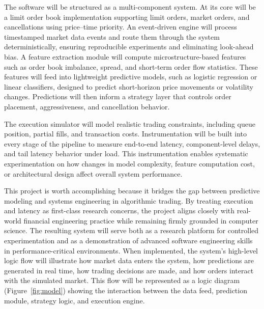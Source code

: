 \documentclass[12pt]{article}
\begin{document}
The software will be structured as a multi-component system. At its core will be a limit order book implementation supporting limit orders, market orders, and cancellations using price–time priority. 
An event-driven engine will process timestamped market data events and route them through the system deterministically, ensuring reproducible experiments and eliminating look-ahead bias. A feature extraction module will compute microstructure-based features such as order book imbalance, spread, and short-term order flow statistics. 
These features will feed into lightweight predictive models, such as logistic regression or linear classifiers, designed to predict short-horizon price movements or volatility changes. 
Predictions will then inform a strategy layer that controls order placement, aggressiveness, and cancellation behavior.


The execution simulator will model realistic trading constraints, including queue position, partial fills, and transaction costs. 
Instrumentation will be built into every stage of the pipeline to measure end-to-end latency, component-level delays, and tail latency behavior under load. 
This instrumentation enables systematic experimentation on how changes in model complexity, feature computation cost, or architectural design affect overall system performance.

This project is worth accomplishing because it bridges the gap between predictive modeling and systems engineering in algorithmic trading. By treating execution and latency as first-class research concerns, the project aligns closely with real-world financial engineering practice while remaining firmly grounded in computer science. 
The resulting system will serve both as a research platform for controlled experimentation and as a demonstration of advanced software engineering skills in performance-critical environments.
When implemented, the system’s high-level logic flow will illustrate how market data enters the system, how predictions are generated in real time, how trading decisions are made, and how orders interact with the simulated market. 
This flow will be represented as a logic diagram (Figure~\ref{fig:model}) showing the interaction between the data feed, prediction module, strategy logic, and execution engine.
\end{document}
